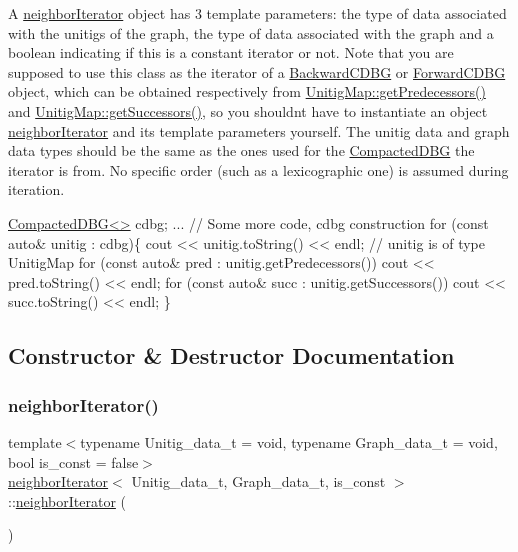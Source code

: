 A \hyperlink{classneighborIterator}{neighbor\+Iterator} object has 3 template parameters\+: the type of data associated with the unitigs of the graph, the type of data associated with the graph and a boolean indicating if this is a constant iterator or not. Note that you are supposed to use this class as the iterator of a \hyperlink{classBackwardCDBG}{Backward\+C\+D\+BG} or \hyperlink{classForwardCDBG}{Forward\+C\+D\+BG} object, which can be obtained respectively from \hyperlink{classUnitigMap_adfae0ba9c3675fd5612a4b71b46a25c6}{Unitig\+Map\+::get\+Predecessors()} and \hyperlink{classUnitigMap_a5b2894e0f78e6b003d06a03a49904b59}{Unitig\+Map\+::get\+Successors()}, so you shouldn\textquotesingle{}t have to instantiate an object \hyperlink{classneighborIterator}{neighbor\+Iterator} and its template parameters yourself. The unitig data and graph data types should be the same as the ones used for the \hyperlink{classCompactedDBG}{Compacted\+D\+BG} the iterator is from. No specific order (such as a lexicographic one) is assumed during iteration. 
\begin{DoxyCode}
\hyperlink{classCompactedDBG}{CompactedDBG<>} cdbg;
... \textcolor{comment}{// Some more code, cdbg construction}
\textcolor{keywordflow}{for} (\textcolor{keyword}{const} \textcolor{keyword}{auto}& unitig : cdbg)\{
  cout << unitig.toString() << endl; \textcolor{comment}{// unitig is of type UnitigMap}
  \textcolor{keywordflow}{for} (\textcolor{keyword}{const} \textcolor{keyword}{auto}& pred : unitig.getPredecessors()) cout << pred.toString() << endl;
  \textcolor{keywordflow}{for} (\textcolor{keyword}{const} \textcolor{keyword}{auto}& succ : unitig.getSuccessors()) cout << succ.toString() << endl;
\}
\end{DoxyCode}
 

\subsection{Constructor \& Destructor Documentation}
\mbox{\label{classneighborIterator_ab857cd8f2e6bb98f844d9316c8e8d5b5}} 
\subsubsection{\texorpdfstring{neighbor\+Iterator()}{neighborIterator()}\hspace{0.1cm}{\footnotesize\ttfamily [1/3]}}
{\footnotesize\ttfamily template$<$typename Unitig\+\_\+data\+\_\+t = void, typename Graph\+\_\+data\+\_\+t = void, bool is\+\_\+const = false$>$ \\
\hyperlink{classneighborIterator}{neighbor\+Iterator}$<$ Unitig\+\_\+data\+\_\+t, Graph\+\_\+data\+\_\+t, is\+\_\+const $>$\+::\hyperlink{classneighborIterator}{neighbor\+Iterator} (\begin{DoxyParamCaption}{ }\end{DoxyParamCaption})}



